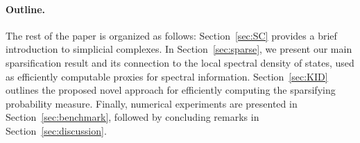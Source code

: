\paragraph*{Outline.} The rest of the paper is organized as follows: Section~\ref{sec:SC} provides a brief introduction to simplicial complexes. In Section~\ref{sec:sparse}, we present our main sparsification result and its connection to the local spectral density of states, used as efficiently computable proxies for spectral information. Section~\ref{sec:KID} outlines the proposed novel approach for efficiently computing the sparsifying probability measure. Finally, numerical experiments are presented in Section~\ref{sec:benchmark}, followed by concluding remarks in Section~\ref{sec:discussion}.

